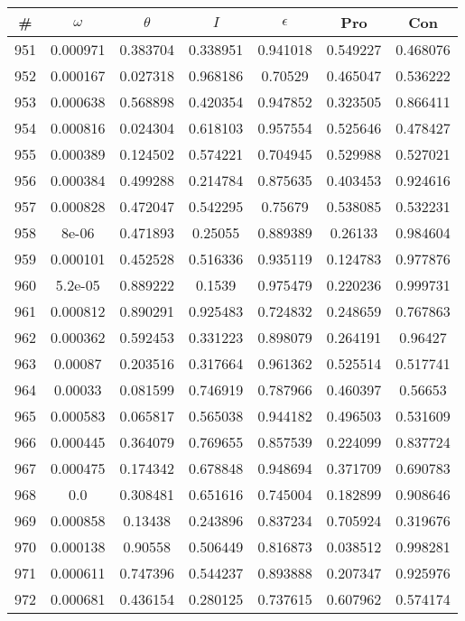 \newpage
\begin{table}
\begin{tabular}{c|c|c|c|c|c|c}
\# & $\omega$ & $\theta$ & $I$ & $\epsilon$ & Pro & Con\\
\hline
951 & 0.000971 & 0.383704 & 0.338951 & 0.941018 & 0.549227 & 0.468076\\
952 & 0.000167 & 0.027318 & 0.968186 & 0.70529 & 0.465047 & 0.536222\\
953 & 0.000638 & 0.568898 & 0.420354 & 0.947852 & 0.323505 & 0.866411\\
954 & 0.000816 & 0.024304 & 0.618103 & 0.957554 & 0.525646 & 0.478427\\
955 & 0.000389 & 0.124502 & 0.574221 & 0.704945 & 0.529988 & 0.527021\\
956 & 0.000384 & 0.499288 & 0.214784 & 0.875635 & 0.403453 & 0.924616\\
957 & 0.000828 & 0.472047 & 0.542295 & 0.75679 & 0.538085 & 0.532231\\
958 & 8e-06 & 0.471893 & 0.25055 & 0.889389 & 0.26133 & 0.984604\\
959 & 0.000101 & 0.452528 & 0.516336 & 0.935119 & 0.124783 & 0.977876\\
960 & 5.2e-05 & 0.889222 & 0.1539 & 0.975479 & 0.220236 & 0.999731\\
961 & 0.000812 & 0.890291 & 0.925483 & 0.724832 & 0.248659 & 0.767863\\
962 & 0.000362 & 0.592453 & 0.331223 & 0.898079 & 0.264191 & 0.96427\\
963 & 0.00087 & 0.203516 & 0.317664 & 0.961362 & 0.525514 & 0.517741\\
964 & 0.00033 & 0.081599 & 0.746919 & 0.787966 & 0.460397 & 0.56653\\
965 & 0.000583 & 0.065817 & 0.565038 & 0.944182 & 0.496503 & 0.531609\\
966 & 0.000445 & 0.364079 & 0.769655 & 0.857539 & 0.224099 & 0.837724\\
967 & 0.000475 & 0.174342 & 0.678848 & 0.948694 & 0.371709 & 0.690783\\
968 & 0.0 & 0.308481 & 0.651616 & 0.745004 & 0.182899 & 0.908646\\
969 & 0.000858 & 0.13438 & 0.243896 & 0.837234 & 0.705924 & 0.319676\\
970 & 0.000138 & 0.90558 & 0.506449 & 0.816873 & 0.038512 & 0.998281\\
971 & 0.000611 & 0.747396 & 0.544237 & 0.893888 & 0.207347 & 0.925976\\
972 & 0.000681 & 0.436154 & 0.280125 & 0.737615 & 0.607962 & 0.574174\\

\end{tabular}
\end{table}
